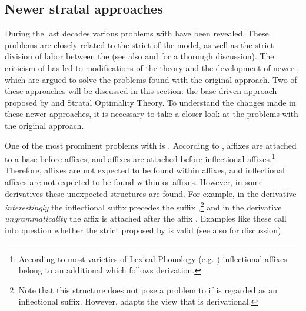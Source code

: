 \subsection{Newer stratal approaches}

During the last decades various problems with  have been revealed. These problems are closely related to the strict  of the model, as well as the strict division of labor between the  (see also \citealt[chapter 2]{Giegerich.1999} and \citealt[chapter 7]{Plag.2003} for a thorough discussion). The criticism of  has led to modifications of the theory and the development of newer , which are argued to solve the problems found with the original approach. Two of these approaches will be discussed in this section: the base-driven approach proposed by \cite{Giegerich.1999} and Stratal Optimality Theory. To understand the changes made in these newer approaches, it is necessary to take a closer look at the problems with the original approach.

One of the most prominent problems with  is . According to ,  affixes are attached to a base before  affixes, and  affixes are attached before inflectional affixes.\footnote{According to most varieties of Lexical Phonology (e.g.  \citealt{Kiparsky.1982,Mohanan.1986}) inflectional affixes belong to an additional  which follows derivation.} Therefore,  affixes are not expected to be found within  affixes, and inflectional affixes are not expected to be found within  or  affixes. However, in some derivatives these unexpected structures are found. For example, in the derivative \textit{interestingly} the inflectional suffix  precedes the  suffix ,\footnote{Note that this structure does not pose a problem to  if  is regarded as an inflectional suffix. However,  adapts the view that  is derivational. } and in the derivative \textit{ungrammaticality} the  affix  is attached after the  affix . Examples like these call into question whether the strict  proposed by  is valid (see also \citet[chapter 4]{Plag.1999} for discussion).

